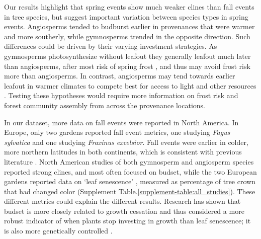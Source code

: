 \documentclass{article}
\begin{document}
Our results highlight that spring events show much weaker clines than fall events in tree species, but suggest important variation between species types in spring events. Angiosperms tended to budburst earlier in provenances that were warmer and more southerly, while gymnosperms trended in the opposite direction. Such differences could be driven by their varying investment strategies. As gymnosperms photosynthesize without leafout they generally leafout much later than angiosperms, after most risk of spring frost \citep{panchen14}, and thus may avoid frost risk more than angiosperms. In contrast, angiosperms may tend towards earlier leafout in warmer climates to compete best for access to light and other resources \citep{cat2019}. Testing these hypotheses would require more information on frost risk and forest community assembly from across the provenance locations. 

In our dataset, more data on fall events were reported in North America. In Europe, only two gardens reported fall event metrics, one studying \emph{Fagus sylvatica} and one studying \emph{Fraxinus excelsior}. Fall events were earlier in colder, more northern latitudes in both continents, which is consistent with previous literature \citep{AitkenBemmels16, Alberto13}. North American studies of both gymnosperm and angiosperm species reported strong clines, and most often focused on budset, while the two European gardens reported data on `leaf senescence' \citep{rosique22}, measured as percentage of tree crown that had changed color (Supplement Table.\ref{supplement-table:all_studies}). These different metrics could explain the different results. Research has shown that budset is more closely related to growth cessation and thus considered a more robust indicator of when plants stop investing in growth than leaf senescence; it is also more genetically controlled \citep[with different photoperiod thresholds required to trigger budset in different provenances,][]{Alberto13}. 
\end{document}
